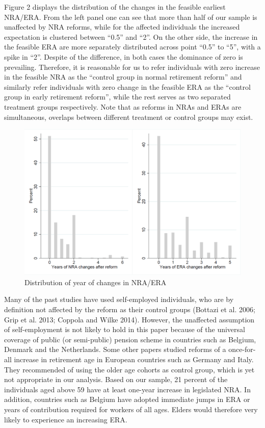 \documentclass[a4paper]{article}
\begin{document}
Figure 2 displays the distribution of the changes in the feasible earliest NRA/ERA. From the left panel one can see that more than half of our sample is unaffected by NRA reforms, while for the affected individuals the increased expectation is clustered between “0.5” and “2”. On the other side, the increase in the feasible ERA are more separately distributed across point “0.5” to “5”, with a spike in “2”. Despite of the difference, in both cases the dominance of zero is prevailing. Therefore, it is reasonable for us to refer individuals with zero increase in the feasible NRA as the “control group in normal retirement reform” and similarly refer individuals with zero change in the feasible ERA as the “control group in early retirement reform”, while the rest serves as two separated treatment groups respectively. Note that as reforms in NRAs and ERAs are simultaneous, overlaps between different treatment or control groups may exist.

\begin{figure}[h] 
    \centering
    \includegraphics[width=1\linewidth]{figure2.png}
    \caption{Distribution of year of changes in NRA/ERA }
    \label{2}
\end{figure}

Many of the past studies have used self-employed individuals, who are by definition not affected by the reform as their control groups (Bottazi et al. 2006; Grip et al. 2013; Coppola and Wilke 2014). However, the unaffected assumption of self-employment is not likely to hold in this paper because of the universal coverage of public (or semi-public) pension scheme in countries such as Belgium, Denmark and the Netherlands. Some other papers studied reforms of a once-for-all increase in retirement age in European countries such as Germany and Italy. They recommended of using the older age cohorts as control group, which is yet not appropriate in our analysis. Based on our sample, 21 percent of the individuals aged above 59 have at least one-year increase in legislated NRA. In addition, countries such as Belgium have adopted immediate jumps in ERA or years of contribution required for workers of all ages. Elders would therefore very likely to experience an increasing ERA. 
\end{document}
